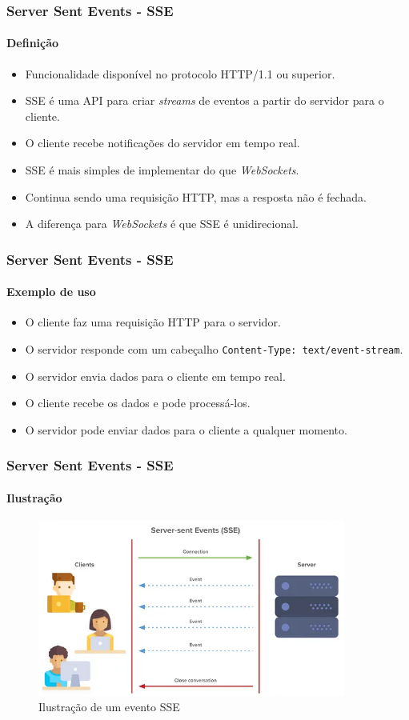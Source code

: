 \documentclass[
	9pt, %
	t, %
]{beamer}
\newcommand{\yellowbox}[1]{\colorbox{yellow!75}{#1}}
\begin{document}
\begin{frame}
	\frametitle{Server Sent Events - SSE}
	\framesubtitle{Definição}

	\begin{itemize}
		\item Funcionalidade disponível no protocolo HTTP/1.1 ou superior.
		\item SSE é uma API para criar \textit{streams} de eventos \yellowbox{a partir do
			      servidor} para o cliente.
		\item O cliente recebe notificações do servidor em \yellowbox{tempo real}.
		\item SSE é mais simples de implementar do que \textit{WebSockets}.
		\item Continua sendo uma requisição HTTP, mas a resposta não é fechada.
		\item A diferença para \textit{WebSockets} é que SSE é \yellowbox{unidirecional}.
	\end{itemize}

\end{frame}

\begin{frame}
	\frametitle{Server Sent Events - SSE}
	\framesubtitle{Exemplo de uso}

	\begin{itemize}
		\item O cliente faz uma requisição HTTP para o servidor.
		\item O servidor responde com um cabeçalho \texttt{Content-Type: text/event-stream}.
		\item O servidor envia dados para o cliente \yellowbox{em tempo real}.
		\item O cliente recebe os dados e pode processá-los.
		\item O servidor pode enviar dados para o cliente \yellowbox{a qualquer momento}.
	\end{itemize}

\end{frame}

\begin{frame}
	\frametitle{Server Sent Events - SSE}
	\framesubtitle{Ilustração}

	\begin{figure}
		\centering
		\includegraphics[width=0.9\textwidth]{sse.png}
		\caption{Ilustração de um evento SSE}
	\end{figure}

\end{frame}
\end{document}
